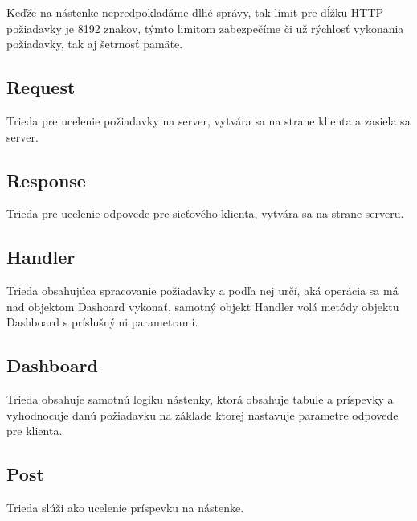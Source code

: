 \documentclass[a4paper,12pt,oneside]{article}
\theoremstyle{definition}
\theoremstyle{definition}
\theoremstyle{definition}
\begin{document}
Keďže na nástenke nepredpokladáme dlhé správy, tak limit pre dĺžku HTTP požiadavky je 8192 znakov, týmto limitom zabezpečíme či už rýchlosť vykonania požiadavky, tak aj šetrnosť pamäte.

\subsection{Request}
Trieda pre ucelenie požiadavky na server, vytvára sa na strane klienta a zasiela sa server.

\subsection{Response}
Trieda pre ucelenie odpovede pre sieťového klienta, vytvára sa na strane serveru.

\subsection{Handler}
Trieda obsahujúca spracovanie požiadavky a podľa nej určí, aká operácia sa má nad objektom Dashoard vykonať, samotný objekt Handler volá metódy objektu Dashboard s príslušnými parametrami.

\subsection{Dashboard}
Trieda obsahuje samotnú logiku nástenky, ktorá obsahuje tabule a príspevky a vyhodnocuje danú požiadavku na základe ktorej nastavuje parametre odpovede pre klienta.

\subsection{Post}
Trieda slúži ako ucelenie príspevku na nástenke.
\end{document}
